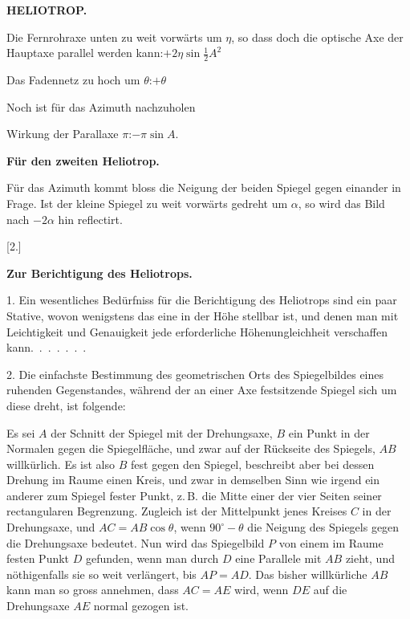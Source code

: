 \clearpage
\noindent\null\hfill{\small\textbf{HELIOTROP.}}\hfill{}\par\medskip
\begin{list}{}{\setlength{\leftmargin}{9mm}\setlength{\labelwidth}{6mm}\setlength{\itemsep}{2pt}\setlength{\parsep}{0pt}\setlength{\topsep}{0pt}}
\item[7.] Die Fernrohraxe unten zu weit vorwärts um $\eta$,
so dass doch die optische Axe der Hauptaxe
parallel werden kann:\hfill $+2\eta\sin\frac12 A^2$
\item[8.] Das Fadennetz zu hoch um $\theta$:\hfill $+\theta$
\end{list}
\noindent Noch ist für das Azimuth nachzuholen\par
\hspace*{9mm}Wirkung der Parallaxe $\pi$:\hfill $-\pi\sin A.$
\begin{center}\textbf{Für den zweiten Heliotrop.}\end{center}
Für das Azimuth kommt bloss die Neigung der beiden Spiegel gegen
einander in Frage. Ist der kleine Spiegel zu weit vorwärts gedreht um $\alpha$, so
wird das Bild nach $-2\alpha$ hin reflectirt.
\begin{center}
[2.]\par\medskip
\textbf{Zur Berichtigung des Heliotrops.}
\end{center}
1. Ein wesentliches Bedürfniss für die Berichtigung des Heliotrops sind
ein paar Stative, wovon wenigstens das eine in der Höhe stellbar ist, und
denen man mit Leichtigkeit und Genauigkeit jede erforderliche Höhenungleichheit
verschaffen kann.\ .\ .\ .\ .\ .\ .

2. Die einfachste Bestimmung des geometrischen Orts des Spiegelbildes
eines ruhenden Gegenstandes, während der an einer Axe festsitzende Spiegel
sich um diese dreht, ist folgende:

Es sei $A$ der Schnitt der Spiegel mit der Drehungsaxe, $B$ ein
Punkt in der Normalen gegen die Spiegelfläche, und zwar auf der Rückseite
des Spiegels, $AB$ willkürlich. Es ist also $B$ fest gegen den Spiegel, beschreibt
aber bei dessen Drehung im Raume einen Kreis, und zwar in demselben
Sinn wie irgend ein anderer zum Spiegel fester Punkt, z.\,B. die Mitte
einer der vier Seiten seiner rectangularen Begrenzung. Zugleich ist der Mittelpunkt
jenes Kreises $C$ in der Drehungsaxe, und $AC=AB\cos\theta$, wenn $90^\circ-\theta$
die Neigung des Spiegels gegen die Drehungsaxe bedeutet. Nun wird das
Spiegelbild $P$ von einem im Raume festen Punkt $D$ gefunden, wenn man
durch $D$ eine Parallele mit $AB$ zieht, und nöthigenfalls sie so weit verlängert,
bis $AP=AD$. Das bisher willkürliche $AB$ kann man so gross annehmen,
dass $AC=AE$ wird, wenn $DE$ auf die Drehungsaxe $AE$ normal gezogen ist.

